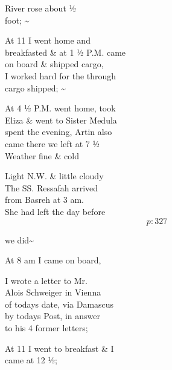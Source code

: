 \documentclass{report}
\begin{document}
	\par{
 	River rose about ½\ \\foot; \~{}\ \\
	}

	\par{
 	At 11 I went home and\ \\breakfasted \& at 1 ½ P.M. came\ \\on board \& shipped cargo,\ \\I worked hard for the through\ \\cargo shipped; \~{}\ \\
	}

	\par{
 	At 4 ½ P.M. went home, took\ \\Eliza \& went to Sister Medula\ \\spent the evening, Artin also\ \\came there we left at 7 ½\ \\Weather fine \& cold\ \\
	}

	\par{
 	Light N.W. \& little cloudy\ \\The SS. Ressafah arrived\ \\from Basreh at 3 am.\ \\She had left the day before\ \\
  \[p: 327 \]

	}



	\par{
 	we did\~{}\ \\
	}

	\par{
 	At 8 am I came on board,\ \\
	}

	\par{
 	I wrote a letter to Mr.\ \\Alois Schweiger in Vienna\ \\of todays date, via Damascus\ \\by todays Post, in answer\ \\to his 4 former letters;\ \\
	}

	\par{
 	At 11 I went to breakfast \& I\ \\came at 12 ½;\ \\
	}
\end{document}
